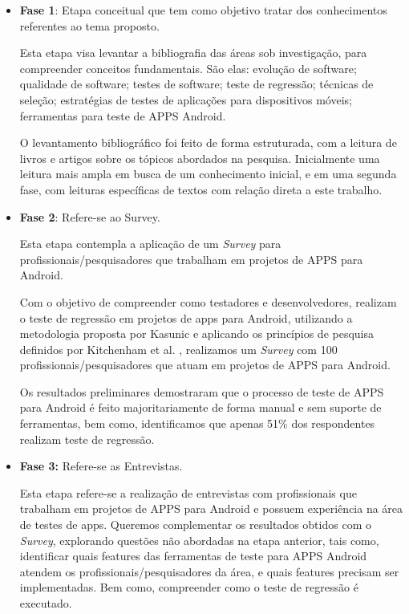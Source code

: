 \begin{itemize}
  \item \textbf{Fase 1}: Etapa conceitual que tem como objetivo tratar dos conhecimentos referentes ao tema proposto.
  
  Esta etapa visa levantar a bibliografia das áreas sob investigação, para compreender conceitos fundamentais. São elas: evolução de software; qualidade de software; testes de software; teste de regressão; técnicas de seleção; estratégias de testes de aplicações para dispositivos móveis; ferramentas para teste de \ac{APPS} Android.
  
  O levantamento bibliográfico foi feito de forma estruturada, com a leitura de livros e artigos sobre os tópicos abordados na pesquisa. Inicialmente uma leitura mais ampla em busca de um conhecimento inicial, e em uma segunda fase, com leituras específicas de textos com relação direta a este trabalho.
  
  \item \textbf{Fase 2}: Refere-se ao Survey.
  
  Esta etapa contempla a aplicação de um \textit{Survey} para profissionais/pesquisadores que trabalham em projetos de \ac{APPS} para Android.
  
  Com o objetivo de compreender como testadores e desenvolvedores, realizam o teste de regressão em projetos de apps para Android, utilizando a metodologia proposta por Kasunic \cite{Kasunic2005DesigningAE} e aplicando os princípios de pesquisa definidos por Kitchenham et al. \cite{Kitchenham:2002:PSR:566493.566495}, realizamos um \textit{Survey} com 100 profissionais/pesquisadores que atuam em projetos de \ac{APPS} para Android. 
  
  Os resultados preliminares demostraram que o processo de teste de \ac{APPS} para Android é feito majoritariamente de forma manual e sem suporte de ferramentas, bem como, identificamos que apenas 51\% dos respondentes realizam teste de regressão.
 
  \item \textbf{Fase 3:} Refere-se as Entrevistas.
  
  Esta etapa refere-se a realização de entrevistas com profissionais que trabalham em projetos de \ac{APPS} para Android e possuem experiência na área de testes de apps. Queremos complementar os resultados obtidos com o \textit{Survey}, explorando questões não abordadas na etapa anterior, tais como, identificar quais features das ferramentas de teste para \ac{APPS} Android atendem os profissionais/pesquisadores da área, e quais features precisam ser implementadas. Bem como, compreender como o teste de regressão é executado.
  

\end{itemize}
